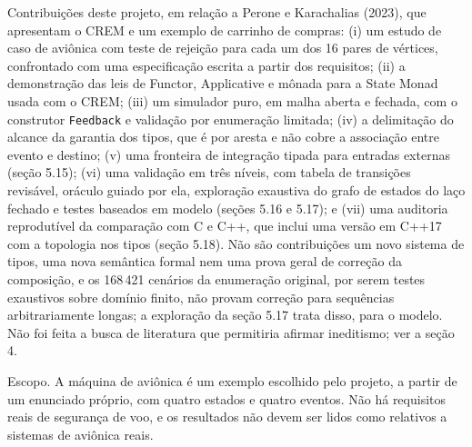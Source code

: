 \documentclass[12pt,a4paper]{article}
\begin{document}
Contribuições deste projeto, em relação a Perone e Karachalias (2023), que apresentam o CREM e um exemplo de carrinho de compras: (i) um estudo de caso de aviônica com teste de rejeição para cada um dos 16 pares de vértices, confrontado com uma especificação escrita a partir dos requisitos; (ii) a demonstração das leis de Functor, Applicative e mônada para a State Monad usada com o CREM; (iii) um simulador puro, em malha aberta e fechada, com o construtor \texttt{Feedback} e validação por enumeração limitada; (iv) a delimitação do alcance da garantia dos tipos, que é por aresta e não cobre a associação entre evento e destino; (v) uma fronteira de integração tipada para entradas externas (seção 5.15); (vi) uma validação em três níveis, com tabela de transições revisável, oráculo guiado por ela, exploração exaustiva do grafo de estados do laço fechado e testes baseados em modelo (seções 5.16 e 5.17); e (vii) uma auditoria reprodutível da comparação com C e C++, que inclui uma versão em C++17 com a topologia nos tipos (seção 5.18). Não são contribuições um novo sistema de tipos, uma nova semântica formal nem uma prova geral de correção da composição, e os 168\,421 cenários da enumeração original, por serem testes exaustivos sobre domínio finito, não provam correção para sequências arbitrariamente longas; a exploração da seção 5.17 trata disso, para o modelo. Não foi feita a busca de literatura que permitiria afirmar ineditismo; ver a seção 4.

Escopo. A máquina de aviônica é um exemplo escolhido pelo projeto, a partir de um enunciado próprio, com quatro estados e quatro eventos. Não há requisitos reais de segurança de voo, e os resultados não devem ser lidos como relativos a sistemas de aviônica reais.
\end{document}
